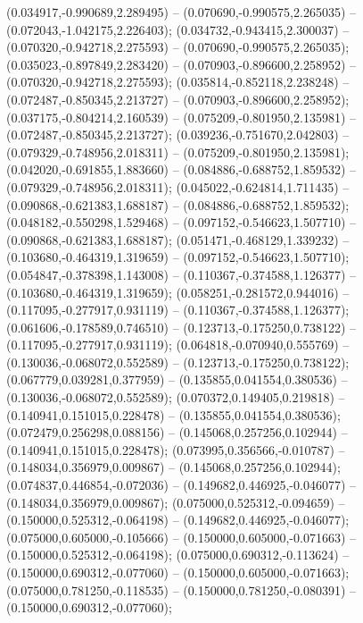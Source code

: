  (0.034917,-0.990689,2.289495) -- (0.070690,-0.990575,2.265035) -- (0.072043,-1.042175,2.226403);
 (0.034732,-0.943415,2.300037) -- (0.070320,-0.942718,2.275593) -- (0.070690,-0.990575,2.265035);
 (0.035023,-0.897849,2.283420) -- (0.070903,-0.896600,2.258952) -- (0.070320,-0.942718,2.275593);
 (0.035814,-0.852118,2.238248) -- (0.072487,-0.850345,2.213727) -- (0.070903,-0.896600,2.258952);
 (0.037175,-0.804214,2.160539) -- (0.075209,-0.801950,2.135981) -- (0.072487,-0.850345,2.213727);
 (0.039236,-0.751670,2.042803) -- (0.079329,-0.748956,2.018311) -- (0.075209,-0.801950,2.135981);
 (0.042020,-0.691855,1.883660) -- (0.084886,-0.688752,1.859532) -- (0.079329,-0.748956,2.018311);
 (0.045022,-0.624814,1.711435) -- (0.090868,-0.621383,1.688187) -- (0.084886,-0.688752,1.859532);
 (0.048182,-0.550298,1.529468) -- (0.097152,-0.546623,1.507710) -- (0.090868,-0.621383,1.688187);
 (0.051471,-0.468129,1.339232) -- (0.103680,-0.464319,1.319659) -- (0.097152,-0.546623,1.507710);
 (0.054847,-0.378398,1.143008) -- (0.110367,-0.374588,1.126377) -- (0.103680,-0.464319,1.319659);
 (0.058251,-0.281572,0.944016) -- (0.117095,-0.277917,0.931119) -- (0.110367,-0.374588,1.126377);
 (0.061606,-0.178589,0.746510) -- (0.123713,-0.175250,0.738122) -- (0.117095,-0.277917,0.931119);
 (0.064818,-0.070940,0.555769) -- (0.130036,-0.068072,0.552589) -- (0.123713,-0.175250,0.738122);
 (0.067779,0.039281,0.377959) -- (0.135855,0.041554,0.380536) -- (0.130036,-0.068072,0.552589);
 (0.070372,0.149405,0.219818) -- (0.140941,0.151015,0.228478) -- (0.135855,0.041554,0.380536);
 (0.072479,0.256298,0.088156) -- (0.145068,0.257256,0.102944) -- (0.140941,0.151015,0.228478);
 (0.073995,0.356566,-0.010787) -- (0.148034,0.356979,0.009867) -- (0.145068,0.257256,0.102944);
 (0.074837,0.446854,-0.072036) -- (0.149682,0.446925,-0.046077) -- (0.148034,0.356979,0.009867);
 (0.075000,0.525312,-0.094659) -- (0.150000,0.525312,-0.064198) -- (0.149682,0.446925,-0.046077);
 (0.075000,0.605000,-0.105666) -- (0.150000,0.605000,-0.071663) -- (0.150000,0.525312,-0.064198);
 (0.075000,0.690312,-0.113624) -- (0.150000,0.690312,-0.077060) -- (0.150000,0.605000,-0.071663);
 (0.075000,0.781250,-0.118535) -- (0.150000,0.781250,-0.080391) -- (0.150000,0.690312,-0.077060);
